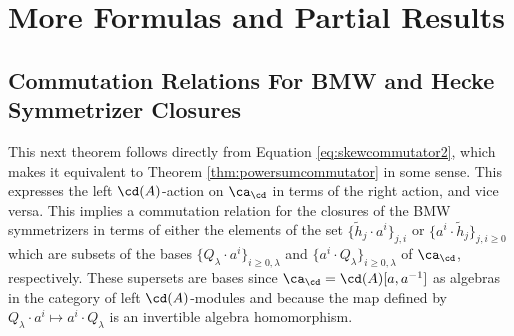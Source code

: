 \chapter{More Formulas and Partial Results}


\section{Commutation Relations For BMW and Hecke Symmetrizer Closures}

This next theorem follows directly from Equation \eqref{eq:skewcommutator2}, which makes it equivalent to Theorem \ref{thm:powersumcommutator} in some sense. This expresses the left $\cd(A)$-action on $\ca_\cd$ in terms of the right action, and vice versa. This implies a commutation relation for the closures of the BMW symmetrizers in terms of either the elements of the set $\{\tilde{h}_j \cdot a^i \}_{j, i}$ or $\{ a^i \cdot \tilde{h}_j \}_{j, i \geq 0}$ which are subsets of the bases $\{ Q_\lambda \cdot a^i \}_{i \geq 0, \lambda}$ and $\{ a^i \cdot Q_\lambda \}_{i \geq 0, \lambda}$ of $\ca_\cd$, respectively. These supersets are bases since $\ca_\cd = \cd(A)[a, a^{-1}]$ as algebras in the category of left $\cd(A)$-modules and because the map defined by $Q_\lambda \cdot a^i \mapsto a^i \cdot Q_\lambda$ is an invertible algebra homomorphism. 

